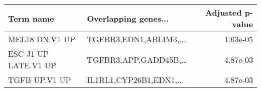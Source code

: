 \begin{tabular}{llr}
\toprule
           Term name &    Overlapping genes... &  Adjusted p-value \\
\midrule
      MEL18 DN.V1 UP &  TGFBR3,EDN1,ABLIM3,... &          1.63e-05 \\
ESC J1 UP LATE.V1 UP &  TGFBR3,APP,GADD45B,... &          4.87e-03 \\
       TGFB UP.V1 UP & IL1RL1,CYP26B1,EDN1,... &          4.87e-03 \\
\bottomrule
\end{tabular}
